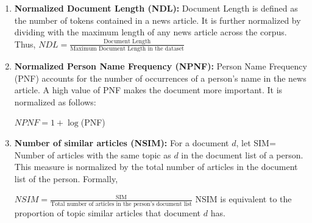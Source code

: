 \documentclass[a4paper,man,natbib]{apa6}
\begin{document}
\begin{enumerate}
\item \textbf{Normalized Document Length (NDL): } Document Length is defined as the number of tokens contained in a news article. It is further normalized by dividing with the maximum length of any news article across the corpus. Thus,  
$NDL= \frac{\text{Document Length}} {\text{Maximum Document Length in the dataset}}$


\item \textbf{ Normalized Person Name Frequency (NPNF): }
Person Name Frequency (PNF) accounts for the number of occurrences of a person's name in the news article. A high value of PNF makes the document more important. It is normalized as follows:

\begin{center}
$NPNF=	1+\log$(PNF)
\end{center}

\item \textbf{Number of similar articles (NSIM): }
For a document $d$, let  SIM= Number of articles with the same topic as $d$ in the document list of a person.
This measure is normalized by the total number of articles in the document list of the person. Formally,

$NSIM= \frac{\text{SIM}} {\text{Total number of articles in the person's document list}}$
NSIM is equivalent to the proportion of topic similar articles that document $d$ has.


\end{enumerate}
\end{document}
